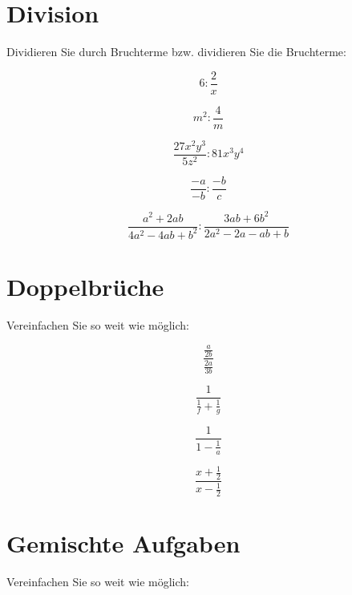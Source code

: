 {\section{Division}
Dividieren Sie durch Bruchterme bzw. dividieren Sie die Bruchterme:

\begin{bbwAufgabenBlock}
\item $$6 : \frac2{x}$$

\item $$m^2 : \frac4{m}$$

\item $$\frac{27x^2y^3}{5z^2} : 81x^3y^4$$

\item $$\frac{-a}{-b} : \frac{-b}{c}$$

\item $$\frac{a^2+2ab}{4a^2-4ab+b^2} : \frac{3ab+6b^2}{2a^2-2a-ab+b}$$

\end{bbwAufgabenBlock}
\newpage
\section{Doppelbrüche}
Vereinfachen Sie so weit wie möglich:

\begin{bbwAufgabenBlock}
\item $$\frac{\frac{a}{2b}}{\frac{2a}{3b}}$$

\item $$\frac{1}{\frac1f + \frac1g}$$

\item $$\frac{1}{1-\frac1a}$$

\item $$\frac{x+\frac12}{x-\frac12}$$

\end{bbwAufgabenBlock}
\newpage
\section{Gemischte Aufgaben}
Vereinfachen Sie so weit wie möglich:

}
